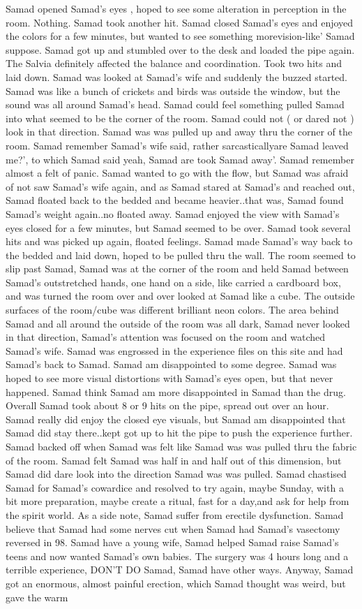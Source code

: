 \documentclass[12pt]{book}
\begin{document}
Samad opened Samad's eyes , hoped to see some alteration in perception in the room. Nothing. Samad took another hit. Samad closed Samad's eyes and enjoyed the colors for a few minutes, but wanted to see something morevision-like' Samad suppose. Samad got up and stumbled over to the desk and loaded the pipe again. The Salvia definitely affected the balance and coordination. Took two hits and laid down. Samad was looked at Samad's wife and suddenly the buzzed started. Samad was like a bunch of crickets and birds was outside the window, but the sound was all around Samad's head. Samad could feel something pulled Samad into what seemed to be the corner of the room. Samad could not ( or dared not ) look in that direction. Samad was was pulled up and away thru the corner of the room. Samad remember Samad's wife said, rather sarcasticallyare Samad leaved me?', to which Samad said yeah, Samad are took Samad away'. Samad remember almost a felt of panic. Samad wanted to go with the flow, but Samad was afraid of not saw Samad's wife again, and as Samad stared at Samad's and reached out, Samad floated back to the bedded and became heavier..that was, Samad found Samad's weight again..no floated away. Samad enjoyed the view with Samad's eyes closed for a few minutes, but Samad seemed to be over. Samad took several hits and was picked up again, floated feelings. Samad made Samad's way back to the bedded and laid down, hoped to be pulled thru the wall. The room seemed to slip past Samad, Samad was at the corner of the room and held Samad between Samad's outstretched hands, one hand on a side, like carried a cardboard box, and was turned the room over and over looked at Samad like a cube. The outside surfaces of the room/cube was different brilliant neon colors. The area behind Samad and all around the outside of the room was all dark, Samad never looked in that direction, Samad's attention was focused on the room and watched Samad's wife. Samad was engrossed in the experience files on this site and had Samad's back to Samad. Samad am disappointed to some degree. Samad was hoped to see more visual distortions with Samad's eyes open, but that never happened. Samad think Samad am more disappointed in Samad than the drug. Overall Samad took about 8 or 9 hits on the pipe, spread out over an hour. Samad really did enjoy the closed eye visuals, but Samad am disappointed that Samad did stay there..kept got up to hit the pipe to push the experience further. Samad backed off when Samad was felt like Samad was was pulled thru the fabric of the room. Samad felt Samad was half in and half out of this dimension, but Samad did dare look into the direction Samad was was pulled. Samad chastised Samad for Samad's cowardice and resolved to try again, maybe Sunday, with a bit more preparation, maybe create a ritual, fast for a day,and ask for help from the spirit world. As a side note, Samad suffer from erectile dysfunction. Samad believe that Samad had some nerves cut when Samad had Samad's vasectomy reversed in 98. Samad have a young wife, Samad helped Samad raise Samad's teens and now wanted Samad's own babies. The surgery was 4 hours long and a terrible experience, DON'T DO Samad, Samad have other ways. Anyway, Samad got an enormous, almost painful erection, which Samad thought was weird, but gave the warm 
\end{document}
